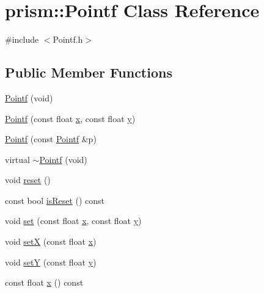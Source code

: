 \hypertarget{classprism_1_1_pointf}{}\section{prism\+:\+:Pointf Class Reference}
\label{classprism_1_1_pointf}


{\ttfamily \#include $<$Pointf.\+h$>$}

\subsection*{Public Member Functions}
\begin{DoxyCompactItemize}
\item 
\hyperlink{classprism_1_1_pointf_a214778342e0ac8ca95ebee01e196af20}{Pointf} (void)
\item 
\hyperlink{classprism_1_1_pointf_a8c069c8a342d043475661270d19e6579}{Pointf} (const float \hyperlink{classprism_1_1_pointf_af55252d2e1d5ba4d2358538aadeaf6a8}{x}, const float \hyperlink{classprism_1_1_pointf_a2fedfacbfdce3fc0a305bb0ed2529f62}{y})
\item 
\hyperlink{classprism_1_1_pointf_a8888306775c8851d1808881025d547df}{Pointf} (const \hyperlink{classprism_1_1_pointf}{Pointf} \&p)
\item 
virtual \hyperlink{classprism_1_1_pointf_aa1917073115feeeae7ef0065b01435a9}{$\sim$\+Pointf} (void)
\item 
void \hyperlink{classprism_1_1_pointf_a31b2e88932f79ac96b2372a8443ede29}{reset} ()
\item 
const bool \hyperlink{classprism_1_1_pointf_afb4d14c8abbe802ea4be1de549ce36fd}{is\+Reset} () const 
\item 
void \hyperlink{classprism_1_1_pointf_a2848b665d31a7ca22a268803870f4158}{set} (const float \hyperlink{classprism_1_1_pointf_af55252d2e1d5ba4d2358538aadeaf6a8}{x}, const float \hyperlink{classprism_1_1_pointf_a2fedfacbfdce3fc0a305bb0ed2529f62}{y})
\item 
void \hyperlink{classprism_1_1_pointf_ac9cff1c37b29ba26efd4a1eeea5212d6}{setX} (const float \hyperlink{classprism_1_1_pointf_af55252d2e1d5ba4d2358538aadeaf6a8}{x})
\item 
void \hyperlink{classprism_1_1_pointf_af27c766dfd1d5973e3ec1d9ce2defb80}{setY} (const float \hyperlink{classprism_1_1_pointf_a2fedfacbfdce3fc0a305bb0ed2529f62}{y})
\item 
const float \hyperlink{classprism_1_1_pointf_af55252d2e1d5ba4d2358538aadeaf6a8}{x} () const 
\item 

\end{DoxyCompactItemize}

